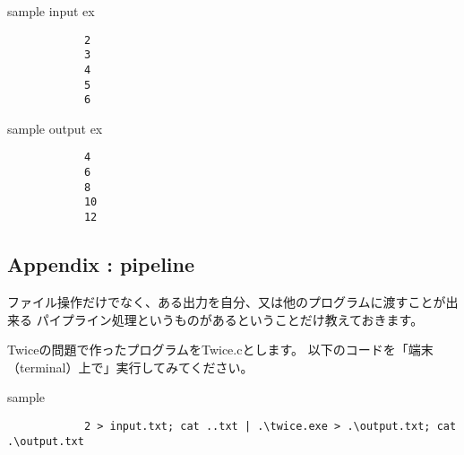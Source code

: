 		\begin{itembox}{sample input ex}
			\begin{verbatim}
			2
			3
			4
			5
			6
			\end{verbatim}
		\end{itembox}
		
		\begin{itembox}{sample output ex}
			\begin{verbatim}
			4
			6
			8
			10
			12
			\end{verbatim}
		\end{itembox}
	
	\subsection{Appendix : pipeline}
		ファイル操作だけでなく、ある出力を自分、又は他のプログラムに渡すことが出来る
		パイプライン処理というものがあるということだけ教えておきます。
		
		Twiceの問題で作ったプログラムをTwice.cとします。
		以下のコードを「端末（terminal）上で」実行してみてください。
		
		\begin{itembox}{sample}
			\begin{verbatim}
			2 > input.txt; cat ..txt | .\twice.exe > .\output.txt; cat .\output.txt
			\end{verbatim}
		\end{itembox}
		
		
